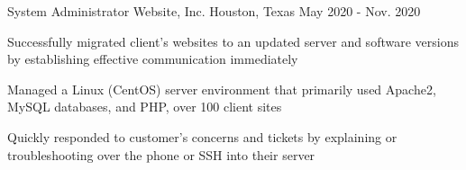     \begin{cventries}

      \cventry
        {System Administrator} %
        {Website, Inc.} %
        {Houston, Texas} %
        {May 2020 - Nov. 2020} %
        {
          \begin{cvitems}
            \item {Successfully migrated client's websites to an updated server and software versions by establishing effective communication immediately}
            \item {Managed a Linux (CentOS) server environment that primarily used Apache2, MySQL databases, and PHP, over 100 client sites}
            \item {Quickly responded to customer's concerns and tickets by explaining or troubleshooting over the phone or SSH into their server}
          \end{cvitems}
        }
  \end{cventries}